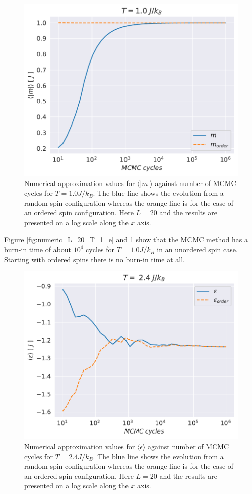 \documentclass[english,notitlepage,reprint,nofootinbib]{revtex4-1}  %
\begin{document}
\begin{figure}[H]
    \centering
    \includegraphics[width=.5\textwidth]{../figures/numeric_L_20_T_1_m.pdf}
    \caption{Numerical approximation values for $\langle |m| \rangle$ against number of MCMC cycles for $T=1.0 J/k_B$. The blue line shows the evolution from a random spin configuration whereas the orange line is for the case of an ordered spin configuration. Here $L=20$ and the results are presented on a log scale along the $x$ axis.}
    \label{fig:numeric_L_20_T_1_m}
\end{figure}
Figure \ref{fig:numeric_L_20_T_1_e} and \ref{fig:numeric_L_20_T_1_m} show that the MCMC method has a burn-in time of about $10^4$ cycles for $T=1.0J/k_B$ in an unordered spin case. Starting with ordered spins there is no burn-in time at all.

\begin{figure}[H]
    \centering
    \includegraphics[width=.5\textwidth]{../figures/numeric_L_20_T_2_4_e.pdf}
    \caption{Numerical approximation values for $\langle \epsilon \rangle$ against number of MCMC cycles for $T=2.4 J/k_B$. The blue line shows the evolution from a random spin configuration whereas the orange line is for the case of an ordered spin configuration. Here $L=20$ and the results are presented on a log scale along the $x$ axis.}
    \label{fig:numeric_L_20_T_2_4_e}
\end{figure}
\end{document}

